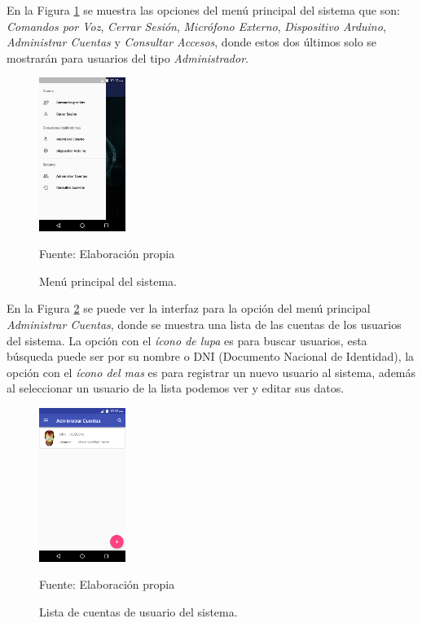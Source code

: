 En la Figura \ref{fig:figura3.39} se muestra las opciones del menú principal del sistema que son: \textit{Comandos por Voz}, \textit{Cerrar Sesión}, \textit{Micrófono Externo}, \textit{Dispositivo Arduino}, \textit{Administrar Cuentas} y \textit{Consultar Accesos}, donde estos dos últimos solo se mostrarán para usuarios del tipo \textit{Administrador}.
\begin{figure}[H]
\captionsetup{justification=centering}
\begin{center}
\includegraphics[width=0.25\textwidth]{Imagenes/Cap3/image039}
\end{center}
\begin{center}
\vskip -0.5cm
\caption{\small{Menú principal del sistema.}}
\label{fig:figura3.39}
{\small{Fuente: Elaboración propia}}
\end{center}
\end{figure}

En la Figura \ref{fig:figura3.40} se puede ver la interfaz para la opción del menú principal \textit{Administrar Cuentas}, donde se muestra una lista de las cuentas de los usuarios del sistema. La opción con el \textit{ícono de lupa} es para buscar usuarios, esta búsqueda puede ser por su nombre o DNI (Documento Nacional de Identidad), la opción con el \textit{ícono del mas} es para registrar un nuevo usuario al sistema, además al seleccionar un usuario de la lista podemos ver y editar sus datos.
\begin{figure}[H]
\captionsetup{justification=centering}
\begin{center}
\includegraphics[width=0.25\textwidth]{Imagenes/Cap3/image040}
\end{center}
\begin{center}
\vskip -0.5cm
\caption{\small{Lista de cuentas de usuario del sistema.}}
\label{fig:figura3.40}
{\small{Fuente: Elaboración propia}}
\end{center}
\end{figure}


